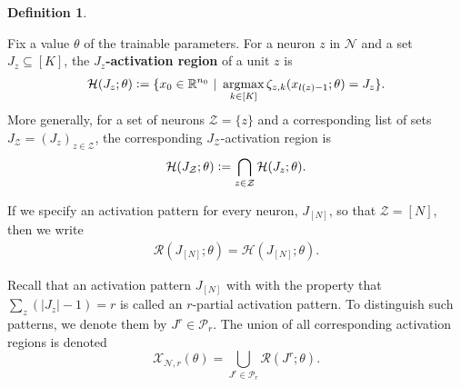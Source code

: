 \documentclass{article}
\theoremstyle{definition}
\newtheorem{definition}[theorem]{Definition}
\DeclareMathOperator*{\argmax}{argmax}
\newcommand{\defeq}{\vcentcolon=}
\newcommand{\net}{\mathcal{N}}
\newcommand{\nin}{n_0}
\begin{document}
\begin{definition}
    \label{def:indecision_locus}
    
    Fix a value $\theta$ of the trainable parameters.
    For a neuron $z$ in $\net$ and a set $J_z \subseteq [K]$, the \textbf{$J_z$-activation region} of a unit $z$ is
    \begin{align*}
        \mathcal{H}(J_z;\theta) \defeq \{x_0 \in \mathbb{R}^{\nin} \ | \ \argmax\limits_{k\in [K]} \zeta_{z, k} (x_{l(z) - 1}; \theta) = J_z  \}.
    \end{align*}
    More generally, for a set of neurons $\mathcal{Z} = \{z\}$ and a corresponding list of sets $J_{\mathcal{Z}} = (J_z)_{z\in\mathcal{Z}}$,  the corresponding $J_\mathcal{Z}$-activation region is 
    \begin{align}
        \mathcal{H}(J_\mathcal{Z}; \theta) \defeq \bigcap\limits_{z\in \mathcal{Z}} \mathcal{H}({J_z};\theta). 
        \label{eq:big_h}
    \end{align}
    
If we specify an activation pattern for every neuron, $J_{[N]}$, so that $\mathcal{Z}=[N]$, then we write 
    \begin{align*}
 \mathcal{R}(J_{[N]}; \theta) = \mathcal{H}(J_{[N]};\theta). 
    \end{align*}

Recall that an activation pattern $J_{[N]}$ with with the property that  $\sum_{z}(|J_z|-1)=r$ is called an $r$-partial activation pattern. 
To distinguish such patterns, we denote them by $J^r \in\mathcal{P}_r$.
The union of all corresponding activation regions is denoted 
    $$
    \mathcal{X}_{\mathcal{N},r}(\theta) = \bigcup_{J^r\in\mathcal{P}_r} \mathcal{R}(J^r;\theta). 
    $$    
\end{definition}
\end{document}

